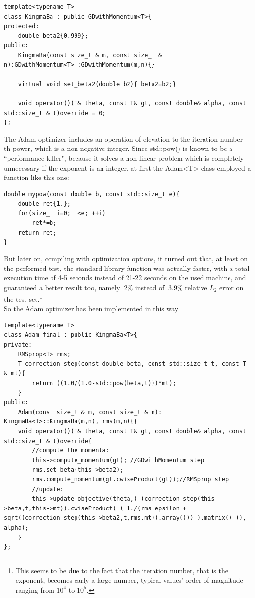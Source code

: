\documentclass[12pt, a4paper]{report}
\theoremstyle{definition}
\begin{document}
\begin{lstlisting}[frame=single]
template<typename T>
class KingmaBa : public GDwithMomentum<T>{
protected:
	double beta2{0.999};
public:
	KingmaBa(const size_t & m, const size_t & n):GDwithMomentum<T>::GDwithMomentum(m,n){}
	
	virtual void set_beta2(double b2){ beta2=b2;}

	void operator()(T& theta, const T& gt, const double& alpha, const std::size_t & t)override = 0;
};
\end{lstlisting}
\newpage\noindent The Adam optimizer includes an operation of elevation to the iteration number-th power, which is a non-negative integer. Since {\ttfamily std::pow()} is known to be a ``performance killer", because it solves a non linear problem which is completely unnecessary if the exponent is an integer, at first the {\ttfamily Adam<T>} class employed a function like this one:
\begin{lstlisting}[frame=single, basicstyle=\fontsize{9}{11}\ttfamily]
double mypow(const double b, const std::size_t e){
	double ret{1.};
	for(size_t i=0; i<e; ++i)
		ret*=b;
	return ret;
}

\end{lstlisting}
But later on, compiling with optimization options, it turned out that, at least on the performed test, the standard library function was actually faster, with a total execution time of 4-5 seconds instead of 21-22 seconds on the used machine, and guaranteed a better result too, namely $~2\%$ instead of $~3.9\%$ relative $L_2$ error on the test set.\footnote{This seems to be due to the fact that the iteration number, that is the exponent, becomes early a large number, typical values' order of magnitude ranging from $10^4$ to $10^5$.}\\
So the Adam optimizer has been implemented in this way:
\begin{lstlisting}[frame=single, showstringspaces=false]
template<typename T>
class Adam final : public KingmaBa<T>{
private:
	RMSprop<T> rms;
	T correction_step(const double beta, const std::size_t t, const T & mt){
		return ((1.0/(1.0-std::pow(beta,t)))*mt);
	}
public:
	Adam(const size_t & m, const size_t & n): KingmaBa<T>::KingmaBa(m,n), rms(m,n){}
	void operator()(T& theta, const T& gt, const double& alpha, const std::size_t & t)override{
		//compute the momenta:
		this->compute_momentum(gt);	//GDwithMomentum step
		rms.set_beta(this->beta2);
		rms.compute_momentum(gt.cwiseProduct(gt));//RMSprop step
		//update:
		this->update_objective(theta,( (correction_step(this->beta,t,this->mt)).cwiseProduct( ( 1./(rms.epsilon + sqrt((correction_step(this->beta2,t,rms.mt)).array())) ).matrix() )), alpha);
	}	
};
\end{lstlisting}
\end{document}
